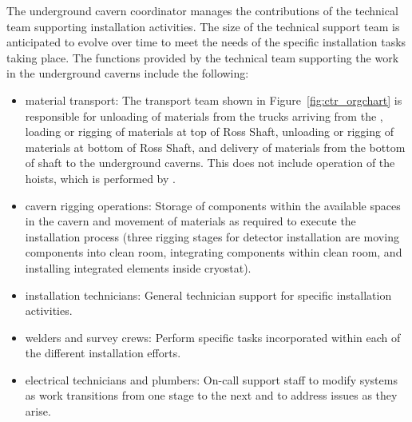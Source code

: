 The underground cavern coordinator manages the contributions of 
the technical team supporting  installation activities.
The size of the technical support team is anticipated to evolve  
over time to meet the needs of the specific installation tasks 
taking place.  The functions provided by the technical team 
supporting the work in the underground caverns include the
following:
\begin{itemize}
  \item {material transport:} The transport team shown in
    Figure~\ref{fig:ctr_orgchart} is responsible for unloading of
    materials from the trucks arriving from the , loading
    or rigging of materials at top of Ross Shaft, unloading or rigging
    of materials at bottom of Ross Shaft, and delivery of materials
    from the bottom of shaft to the underground caverns. This does not
    include operation of the hoists, which is performed by
    .
  \item {cavern rigging operations:}  Storage of 
        components within the available spaces 
        in the cavern and movement of materials as required to 
        execute the installation process (three rigging stages
        for detector installation are moving components into 
        clean room, integrating components within clean room, 
        and installing integrated elements inside cryostat).
  \item {installation technicians:}  General technician 
        support for specific installation activities. 
  \item {welders and survey crews:}  Perform 
        specific tasks incorporated within each of the different 
        installation efforts.
  \item {electrical technicians and plumbers:} On-call support staff
    to modify systems as work transitions from one stage to the next
    and to address issues as they arise.
\end{itemize}   
    
